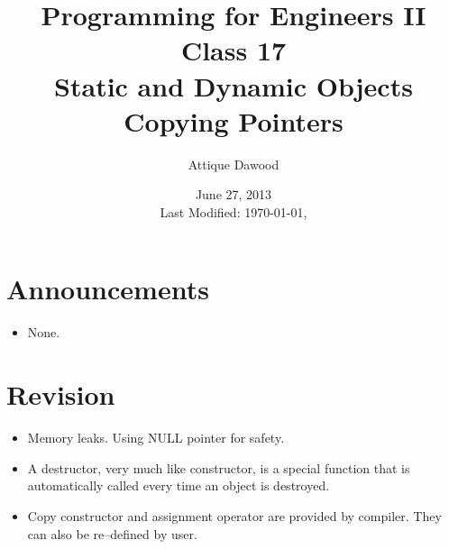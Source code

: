 \documentclass[12pt,a4paper]{article}
\title{\vspace{-2cm}Programming for Engineers II\\Class 17\\Static and Dynamic Objects\\Copying Pointers}
\author{Attique Dawood}
\date{June 27, 2013\\[0.2cm] Last Modified: \today, \currenttime}
\begin{document}
\maketitle
\section{Announcements}
\begin{itemize}
\item None.
\end{itemize}
\section{Revision}
\begin{itemize}
\item Memory leaks. Using NULL pointer for safety.
\item A destructor, very much like constructor, is a special function that is automatically called every time an object is destroyed.
\item Copy constructor and assignment operator are provided by compiler. They can also be re--defined by user.
\end{itemize}
\end{document}
